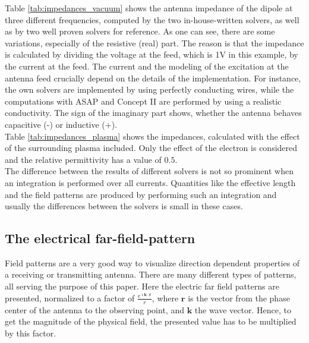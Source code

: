 \documentclass[a4paper,11pt]{article}
\begin{document}
Table \ref{tab:impedances_vacuum} shows the antenna impedance of the dipole at three different frequencies, computed by the two in-house-written solvers, as well as by two well proven solvers for reference. As one can see, there are some variations, especially of the resistive (real) part. The reason is that the impedance is calculated by dividing the voltage at the feed, which is 1V in this example, by the current at the feed. The current and the modeling of the excitation at the antenna feed crucially depend on the details of the implementation. For instance, the own solvers are implemented by using perfectly conducting wires, while the computations with ASAP and Concept II are performed by using a realistic conductivity. The sign of the imaginary part shows, whether the antenna behaves capacitive (-) or inductive (+).\\

Table \ref{tab:impedances_plasma} shows the impedances, calculated with the effect of the surrounding plasma included. Only the effect of the electron is considered and the relative permittivity has a value of $0.5$.\\

The difference between the results of different solvers is not so prominent when an integration is performed over all currents. Quantities like the effective length and the field patterns are produced by performing such an integration and usually the differences between the solvers is small in these cases.\\


\subsection{The electrical far-field-pattern}
Field patterns are a very good way to visualize direction dependent properties of a receiving or transmitting antenna. There are many different types of patterns, all serving the purpose of this paper. Here the electric far field patterns are presented, normalized to a factor of $\frac{e^{\imath \mathbf{k}\cdot \mathbf{r}}}{r}$, where $\mathbf{r}$ is the vector from the phase center of the antenna to the observing point, and $\mathbf{k}$ the wave vector. Hence, to get the magnitude of the physical field, the presented value has to be multiplied by this factor.\\
\end{document}
